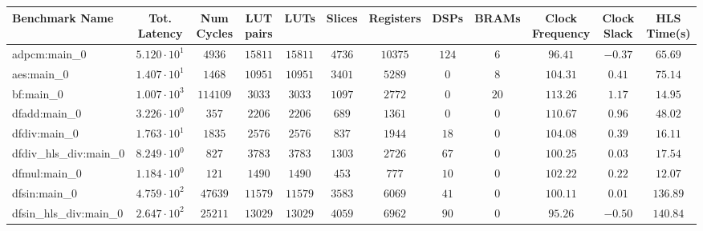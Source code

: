 \begin{tabular}{|l|c|c|c|c|c|c|c|c|c|c|c|}
\hline
Benchmark Name          & Tot. Latency           & Num Cycles & LUT pairs  & LUTs       & Slices    & Registers & DSPs    & BRAMs   & Clock Frequency & Clock Slack & HLS Time(s) \\
\hline
adpcm:main\_0           & $ 5.120 \cdot 10^{1} $ & $ 4936   $ & $ 15811  $ & $ 15811  $ & $ 4736  $ & $ 10375 $ & $ 124 $ & $ 6   $ & $ 96.41       $ & $ -0.37   $ & $ 65.69   $ \\
aes:main\_0             & $ 1.407 \cdot 10^{1} $ & $ 1468   $ & $ 10951  $ & $ 10951  $ & $ 3401  $ & $ 5289  $ & $ 0   $ & $ 8   $ & $ 104.31      $ & $ 0.41    $ & $ 75.14   $ \\
bf:main\_0              & $ 1.007 \cdot 10^{3} $ & $ 114109 $ & $ 3033   $ & $ 3033   $ & $ 1097  $ & $ 2772  $ & $ 0   $ & $ 20  $ & $ 113.26      $ & $ 1.17    $ & $ 14.95   $ \\
dfadd:main\_0           & $ 3.226 \cdot 10^{0} $ & $ 357    $ & $ 2206   $ & $ 2206   $ & $ 689   $ & $ 1361  $ & $ 0   $ & $ 0   $ & $ 110.67      $ & $ 0.96    $ & $ 48.02   $ \\
dfdiv:main\_0           & $ 1.763 \cdot 10^{1} $ & $ 1835   $ & $ 2576   $ & $ 2576   $ & $ 837   $ & $ 1944  $ & $ 18  $ & $ 0   $ & $ 104.08      $ & $ 0.39    $ & $ 16.11   $ \\
dfdiv\_hls\_div:main\_0 & $ 8.249 \cdot 10^{0} $ & $ 827    $ & $ 3783   $ & $ 3783   $ & $ 1303  $ & $ 2726  $ & $ 67  $ & $ 0   $ & $ 100.25      $ & $ 0.03    $ & $ 17.54   $ \\
dfmul:main\_0           & $ 1.184 \cdot 10^{0} $ & $ 121    $ & $ 1490   $ & $ 1490   $ & $ 453   $ & $ 777   $ & $ 10  $ & $ 0   $ & $ 102.22      $ & $ 0.22    $ & $ 12.07   $ \\
dfsin:main\_0           & $ 4.759 \cdot 10^{2} $ & $ 47639  $ & $ 11579  $ & $ 11579  $ & $ 3583  $ & $ 6069  $ & $ 41  $ & $ 0   $ & $ 100.11      $ & $ 0.01    $ & $ 136.89  $ \\
dfsin\_hls\_div:main\_0 & $ 2.647 \cdot 10^{2} $ & $ 25211  $ & $ 13029  $ & $ 13029  $ & $ 4059  $ & $ 6962  $ & $ 90  $ & $ 0   $ & $ 95.26       $ & $ -0.50   $ & $ 140.84  $ \\

\end{tabular}
